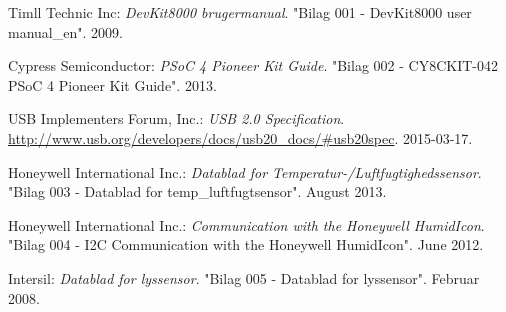 \renewcommand{\bibname}{Litteraturliste}
\begin{thebibliography}{2}

 Timll Technic Inc: \textit{DevKit8000 brugermanual}. "Bilag 001 - DevKit8000 user manual\_en". 2009.

 Cypress Semiconductor: \textit{PSoC 4 Pioneer Kit Guide}. "Bilag 002 - CY8CKIT-042 PSoC 4 Pioneer Kit Guide". 2013.


 USB Implementers Forum, Inc.: \textit{USB 2.0 Specification}. \url{http://www.usb.org/developers/docs/usb20_docs/#usb20spec}. 2015-03-17.

 Honeywell International Inc.: \textit{Datablad for Temperatur-/Luftfugtighedssensor}. "Bilag 003 - Datablad for temp\_luftfugtsensor". August 2013.

 Honeywell International Inc.: \textit{\IIC Communication with the Honeywell HumidIcon}. "Bilag 004 - I2C Communication with the Honeywell HumidIcon". June 2012.

 Intersil: \textit{Datablad for lyssensor}. "Bilag 005 - Datablad for lyssensor". Februar 2008.







\end{thebibliography}